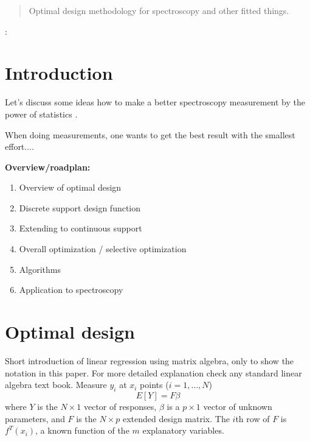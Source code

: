 \documentclass[12pt]{iopart}
\begin{document}
\author{G Imreh and W-Y Cheng}
\address{Institute of Atomic and Molecular Sciences, Academia Sinica, Taiwan}
\begin{abstract}
Optimal design methodology for spectroscopy and other fitted things.
\end{abstract}

:

\pacs{}
\submitto{\MST}

\section{Introduction}



Let's discuss some ideas how to make a better spectroscopy measurement by the power of statistics \cite{Atkinson1992}.

When doing measurements, one wants to get the best result with the smallest effort....




\textbf{Overview/roadplan:}
\begin{enumerate}
\item Overview of optimal design
\item Discrete support design function
\item Extending to continuous support
\item Overall optimization / selective optimization
\item Algorithms
\item Application to spectroscopy
\end{enumerate}

\section{Optimal design}
Short introduction of linear regression using matrix algebra, only to show the notation in this paper. For more detailed explanation check any standard linear algebra text book. Measure $y_i$ at $x_i$ points ($i=1, \ldots, N$)
\begin{equation}
E[Y] = F \beta 
\end{equation}
where $Y$ is the $N \times 1$ vector of responses, $\beta$ is a $p \times 1$ vector of unknown parameters, and $F$ is the $N \times p$ extended design matrix. The $i$th row of $F$ is $f^T(x_i)$, a known function of the $m$ explanatory variables.
\end{document}
